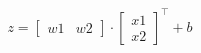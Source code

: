 \documentclass[preview]{standalone}
\begin{document}
\begin{align*}
z = \begin{bmatrix} w1 & w2 \end{bmatrix} \cdot \begin{bmatrix} x1 \\ x2 \end{bmatrix}^\top + b
\end{align*}
\end{document}
